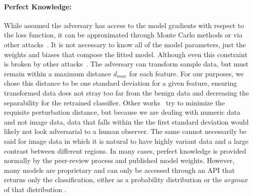 \documentclass[runningheads]{llncs}
\begin{document}
\paragraph{Perfect Knowledge: }
While assumed the adversary has access to the model gradients with respect to the loss function, it can be approximated through Monte Carlo methods or via other attacks~\cite{wang2019security,chakraborty2018adversarial}. It is not necessary to know all of the model parameters, just the weights and biases that compose the fitted model. Although even this constraint is broken by other attacks~\cite{wang2019security,chakraborty2018adversarial}. The adversary can transform sample data, but must remain within a maximum distance $d_{max}$ for each feature. For our purposes, we chose this distance to be one standard deviation for a given feature, ensuring transformed data does not stray too far from the benign data and decreasing the separability for the retrained classifier. Other works~\cite{biggio2012poisoning,stutz2019confidence,li2016general} try to minimize the requisite perturbation distance, but because we are dealing with numeric data and not image data, data that falls within the the first standard deviation would likely not look adversarial to a human observer. The same cannot necessarily be said for image data in which it is natural to have highly variant data and a large contrast between different regions. In many cases, perfect knowledge is provided normally by the peer-review process and published model weights. However, many models are proprietary and can only be accessed through an API that returns only the classification, either as a probability distribution or the $argmax$ of that distribution \cite{tramer2016stealing}. 
\end{document}
